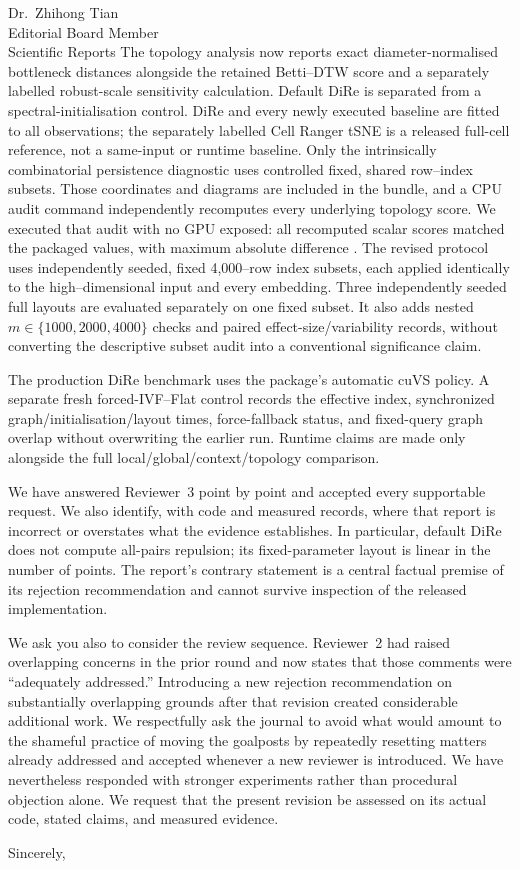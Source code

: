 \documentclass[10pt]{letter}
\begin{document}
\begin{letter}{Dr.\ Zhihong Tian\\Editorial Board Member\\Scientific Reports}
The topology analysis now reports exact diameter-normalised bottleneck
distances alongside the retained Betti--DTW score and a separately labelled
robust-scale sensitivity calculation. Default DiRe is separated from a
spectral-initialisation control.
DiRe and every newly executed baseline are fitted to all observations; the
separately labelled Cell Ranger tSNE is a released full-cell reference, not a
same-input or runtime baseline. Only the intrinsically combinatorial
persistence diagnostic uses controlled fixed, shared row--index subsets. Those coordinates
and diagrams are included in the bundle, and a CPU audit command independently
recomputes every underlying topology score. We executed that audit with no GPU
exposed: all \TopologyAuditComparisonCount{} recomputed scalar scores matched
the packaged values, with maximum absolute difference
\TopologyAuditMaximumAbsoluteDelta{}. The revised protocol uses
\TopologySubsetCount{} independently seeded, fixed 4,000--row index subsets,
each applied identically to the high--dimensional input and every embedding.
Three independently seeded full layouts are evaluated separately on one fixed
subset. It also adds nested $m\in\{1000,2000,4000\}$ checks and paired
effect-size/variability records, without converting the descriptive subset
audit into a conventional significance claim.

The production DiRe benchmark uses the package's automatic cuVS policy. A
separate fresh forced-IVF--Flat control records the effective index,
synchronized graph/initialisation/layout times, force-fallback status, and
fixed-query graph overlap without overwriting the earlier run. Runtime claims
are made only alongside the full local/global/context/topology comparison.

We have answered Reviewer~3 point by point and accepted every supportable
request. We also identify, with code and measured records, where that report is
incorrect or overstates what the evidence establishes. In particular, default
DiRe does not compute all-pairs repulsion; its fixed-parameter layout is linear
in the number of points. The report's contrary statement is a central factual
premise of its rejection recommendation and cannot survive inspection of the
released implementation.

We ask you also to consider the review sequence. Reviewer~2 had raised
overlapping concerns in the prior round and now states that those comments were
``adequately addressed.'' Introducing a new rejection recommendation on
substantially overlapping grounds after that revision created considerable
additional work. We respectfully ask the journal to avoid what would amount to
the shameful practice of moving the goalposts by repeatedly resetting matters
already addressed and accepted whenever a new reviewer is introduced. We have
nevertheless responded with stronger experiments rather than procedural
objection alone. We request that the present revision be assessed on its
actual code, stated claims, and measured evidence.

\closing{Sincerely,}

\end{letter}
\end{document}
